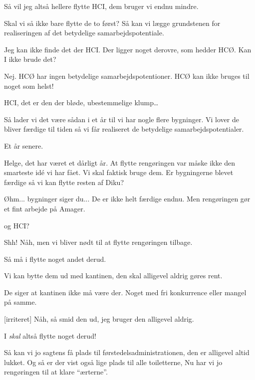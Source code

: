 \documentclass[a4paper,11pt]{article}
\begin{document}
\begin{sketch}

 Så vil jeg altså hellere flytte HCI, dem bruger vi endnu mindre.

 Skal vi så ikke bare flytte de to først? Så kan vi lægge grundstenen for realiseringen af det betydelige samarbejdspotentiale.

 Jeg kan ikke finde det der HCI. Der ligger noget derovre, som hedder
HCØ. Kan I ikke brude det?

 Nej. HCØ har ingen betydelige samarbejdspotentioner. HCØ kan ikke
bruges til noget som helst!

 HCI, det er den der bløde, ubestemmelige klump\ldots


 Så lader vi det være sådan i et år til vi har nogle flere bygninger. Vi lover de bliver færdige til tiden så vi får realiseret de betydelige samarbejdspotentialer.


 Et år senere.

 Helge, det har været et dårligt år. At flytte rengøringen var måske ikke den smarteste idé vi har fået. Vi skal faktisk bruge dem. Er bygningerne blevet færdige så vi kan flytte resten af Diku?

 Øhm... bygninger siger du... De er ikke helt færdige endnu. Men rengøringen gør et fint arbejde på Amager.

 og HCI?

 Shh! Nåh, men vi bliver nødt til at flytte rengøringen tilbage.

 Så må i flytte noget andet derud.

 Vi kan bytte dem ud med kantinen, den skal alligevel aldrig gøres rent.


 De siger at kantinen ikke må være der. Noget med fri konkurrence eller mangel på samme.

[irriteret] Nåh, så smid den ud, jeg bruger den alligevel aldrig.

 I \emph{skal} altså flytte noget derud!

  Så kan vi jo sagtens få plads til førstedelsadministrationen, den er alligevel altid lukket. Og så er der vist også lige plads til alle toiletterne, Nu har vi jo rengøringen til at klare ``ærterne''.


\end{sketch}
\end{document}
